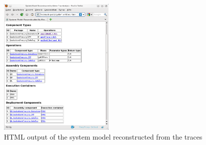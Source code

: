 \pagebreak

\enlargethispage{3cm}

\begin{figure}[h]\centering
\includegraphics[width=0.5\textwidth]{images/example-plots/system-entities-html-FFscrsh.png}
\caption{HTML output of the system model reconstructed from the traces}
\label{fig:appendix:traceAnalysisExample:htmlSystemModel}
\end{figure}
